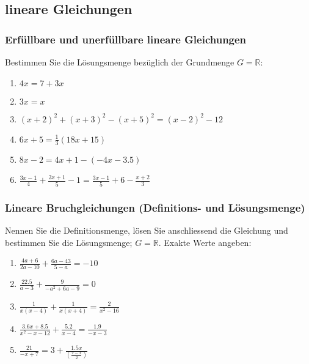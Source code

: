 \setcounter{aufgabenNummer}{1}
  \renewcommand{\kAufgabenBuchstabe}{G}


\subsection{lineare Gleichungen}
\subsubsection{Erfüllbare und unerfüllbare lineare Gleichungen}

Bestimmen Sie die Lösungsmenge bezüglich der Grundmenge
$G=\mathbb{R}$:

\begin{enumerate}[label=\alph*)]
\item $4x=7+3x$
\item $3x=x$
\item $(x+2)^2 + (x+3)^2 - (x+5)^2 = (x-2)^2 - 12$
\item $6x + 5 = \frac{1}{3} (18x + 15)$
\item $8x -2 = 4x + 1 - (-4x - 3.5)$
\item $\frac{3x-1}{4} + \frac{2x+1}{5} - 1 = \frac{3x-1}{5} +6 - \frac{x+2}{3}$
\end{enumerate}

\subsubsection{Lineare Bruchgleichungen (Definitions- und
  Lösungsmenge)}

Nennen Sie die Definitionsmenge, lösen Sie anschliessend die Gleichung
und bestimmen Sie die Lösungsmenge; $G=\mathbb{R}$. Exakte Werte
angeben:

\begin{multicols}{2}
\begin{enumerate}[label=\alph*)]
\item $\frac{4a+6}{2a-10} + \frac{6a-43}{5-a} = -10$
\item $\frac{22.5}{a-3} + \frac{9}{-a^2 + 6a - 9} = 0$
\item $\frac{1}{x(x-4)} + \frac{1}{x(x+4)} = \frac{2}{x^2-16}$
\item $\frac{3.6x+8.5}{x^2-x-12} + \frac{5.2}{x-4} = \frac{1.9}{-x-3}$
\item $\frac{21}{-x+7} = 3 + \frac{1.5x}{\left(\frac{7-x}{2}\right)}$    
\end{enumerate}
\end{multicols}


